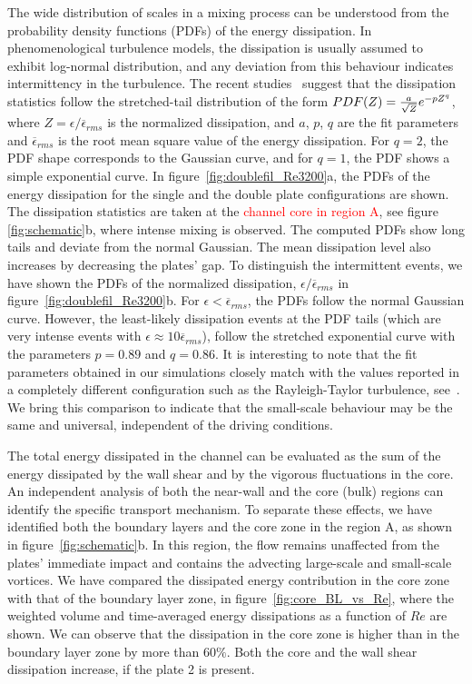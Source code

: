 \documentclass[aps,pre,twocolumn,aps,longbibliography]{revtex4-1}
\begin{document}
	
	The wide distribution of scales in a mixing process can be understood from the probability density functions (PDFs) of the energy dissipation. In phenomenological turbulence models, the dissipation is usually assumed to exhibit log-normal distribution, and any deviation from this behaviour indicates intermittency in the turbulence. The recent studies~\cite{lohsearfm,LohseGrossmann1993} suggest that the dissipation statistics follow the stretched-tail distribution of the form $PDF(Z)= {a\over{\sqrt{Z}}}e^{-pZ^{q}}$, where $Z = {\epsilon/ {\overline{\epsilon}_{rms}}}$ is the normalized dissipation, and $a$, $p$, $q$ are the fit parameters and $\overline{\epsilon}_{rms}$ is the root mean square value of the energy dissipation. For $q=2$, the PDF shape corresponds to the Gaussian curve, and for $q=1$, the PDF shows a simple exponential curve. In figure~\ref{fig:doublefil_Re3200}a, the PDFs of the energy dissipation for the single and the double plate configurations are shown. The dissipation statistics are taken at the \textcolor{red}{channel core in region A}, see figure \ref{fig:schematic}b, where intense mixing is observed. The computed PDFs show long tails and deviate from the normal Gaussian. The mean dissipation level also increases by decreasing the plates' gap. To distinguish the intermittent events, we have shown the PDFs of the normalized dissipation, ${\epsilon}/\overline{\epsilon}_{rms}$ in figure~\ref{fig:doublefil_Re3200}b. For ${\epsilon}<\overline{\epsilon}_{rms}$, the PDFs follow the normal Gaussian curve. However, the least-likely dissipation events at the PDF tails (which are very intense events with ${\epsilon}\approx 10\overline{\epsilon}_{rms}$), follow the stretched exponential curve with the parameters $p=0.89$ and $q=0.86$. It is interesting to note that the fit parameters obtained in our simulations closely match with the values reported in a completely different configuration such as the Rayleigh-Taylor turbulence, see~\cite{ZhouJiang2013}. We bring this comparison to indicate that the small-scale behaviour may be the same and universal, independent of the driving conditions.
	
	The total energy dissipated in the channel can be evaluated as the sum of the energy dissipated by the wall shear and by the vigorous fluctuations in the core. An independent analysis of both the near-wall and the core (bulk) regions can identify the specific transport mechanism. To separate these effects, we have identified both the boundary layers and the core zone in the region A, as shown in figure~\ref{fig:schematic}b. In this region, the flow remains unaffected from the plates' immediate impact and contains the advecting large-scale and small-scale vortices. We have compared the dissipated energy contribution in the core zone with that of the boundary layer zone, in figure~\ref{fig:core_BL_vs_Re}, where the weighted volume and time-averaged energy dissipations as a function of $Re$ are shown. We can observe that the dissipation in the core zone is higher than in the boundary layer zone by more than $60\%$. Both the core and the wall shear dissipation increase, if the plate 2 is present.
	
\end{document}

